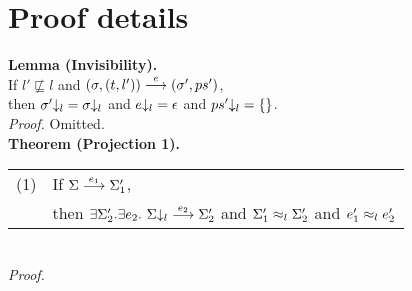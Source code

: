 \section{Proof details}

\textbf{Lemma (Invisibility).}
\\
If $l'\not\sqsubseteq l$
and $\tstep{e}{(\sigma,\process{t}{l'})}{(\sigma',ps')}$,
\\
then $\proj{\sigma'}{l}=\proj{\sigma}{l}$
and $\proj{e}{l}=\epsilon$
and $\proj{ps'}{l}=\{\}$.
\\
\textit{Proof.}
Omitted.
\\
\textbf{Theorem (Projection 1).}
\\
\begin{tabular}{l@{$\qquad$}l}
  (1) & If $\sstep{e_1}{\Sigma}{\Sigma_1'}$,
\\
      & then $\exists\Sigma_2'.\exists e_2.~\sstep{e_2}{\proj{\Sigma}{l}}{\Sigma_2'}$
        and $\lequiv{l}{\Sigma_1'}{\Sigma_2'}$
        and $\lequiv{l}{e_1'}{e_2'}$
\end{tabular}
\\
\textit{Proof.}
\\
\newcommand{\z}{$\quad$}
